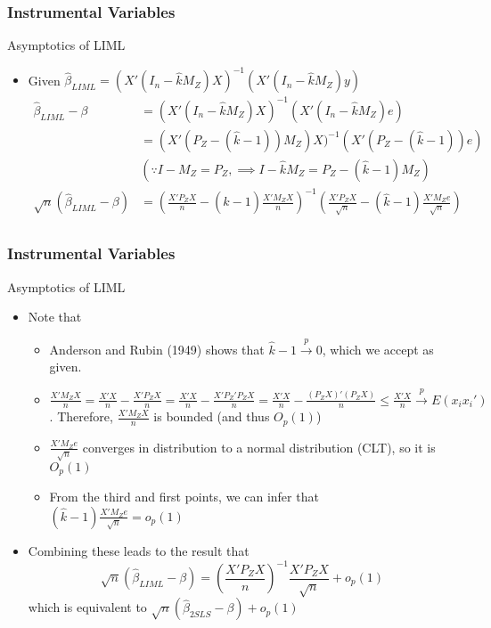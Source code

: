 \documentclass{beamer}
\begin{document}
\begin{frame}
\frametitle{Instrumental Variables}
Asymptotics of LIML
\begin{itemize}
\item  Given $\hat{\beta}_{LIML}=(X'(I_n-\hat{k}M_Z)X)^{-1}(X'(I_n-\hat{k}M_Z)y)$
\footnotesize{\[
\begin{aligned}
\hat{\beta}_{LIML}-\beta &= (X'(I_n-\hat{k}M_Z)X)^{-1}(X'(I_n-\hat{k}M_Z)e)\\
& =(X'(P_Z-(\hat{k}-1))M_Z)X)^{-1}(X'(P_Z-(\hat{k}-1))e) \\
& (\because I-M_Z=P_Z, \implies I-\hat{k}M_Z=P_Z-(\hat{k}-1)M_Z)\\
  \sqrt{n}(\hat{\beta}_{LIML}-\beta)&=\left(\frac{X'P_ZX}{n}-(\hat{k}-1)\frac{X'M_ZX}{n}\right)^{-1}\left(\frac{X'P_ZX}{\sqrt{n}}-(\hat{k}-1)\frac{X'M_Ze}{\sqrt{n}}\right)\\
\end{aligned}
\]}\normalsize
\end{itemize}
\end{frame}


\begin{frame}
\frametitle{Instrumental Variables}
Asymptotics of LIML
\begin{itemize}
\item Note that
\begin{itemize}
\item Anderson and Rubin (1949) shows that $\hat{k}-1\xrightarrow{p}0$, which we accept as given. 
\item $\frac{X'M_ZX}{n}=\frac{X'X}{n}-\frac{X'P_ZX}{n}=\frac{X'X}{n}-\frac{X'P_Z'P_ZX}{n}=\frac{X'X}{n}-\frac{(P_ZX)'(P_ZX)}{n}\leq\frac{X'X}{n}\xrightarrow{p}E(x_ix_i')$. Therefore, $\frac{X'M_ZX}{n}$ is bounded (and thus $O_p(1)$)
\item $\frac{X'M_Ze}{\sqrt{n}}$ converges in distribution to a normal distribution (CLT), so it is $O_p(1)$
\item From the third and first points, we can infer that $(\hat{k}-1)\frac{X'M_Ze}{\sqrt{n}}=o_p(1)$
\end{itemize}
\item Combining these leads to the result that 
\[
 \sqrt{n}(\hat{\beta}_{LIML}-\beta) =\left(\frac{X'P_ZX}{n}\right)^{-1}\frac{X'P_ZX}{\sqrt{n}} +o_p(1)
\]
which is equivalent to $ \sqrt{n}(\hat{\beta}_{2SLS}-\beta) +o_p(1)$
\end{itemize}
\end{frame}
\end{document}
